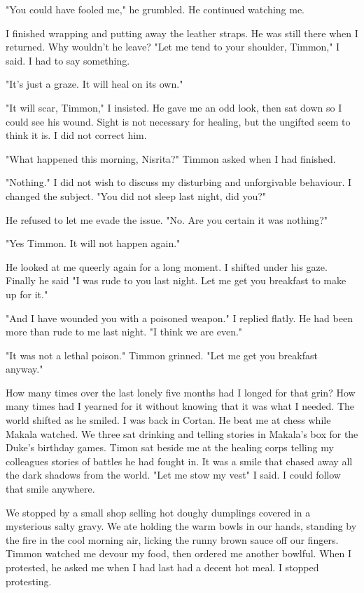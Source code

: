 \documentclass{article}
\begin{document}
"You could have fooled me," he grumbled. He continued watching me. 

I finished wrapping and putting away the leather straps. He was still there when I returned. Why wouldn't he leave? "Let me tend to your shoulder, Timmon," I said. I had to say something.

"It's just a graze. It will heal on its own."

"It will scar, Timmon," I insisted. He gave me an odd look, then sat down so I could see his wound. Sight is not necessary for healing, but the ungifted seem to think it is. I did not correct him.

"What happened this morning, Nisrita?" Timmon asked when I had finished.

"Nothing." I did not wish to discuss my disturbing and unforgivable behaviour. I changed the subject. "You did not sleep last night, did you?"

He refused to let me evade the issue. "No. Are you certain it was nothing?"

"Yes Timmon. It will not happen again."

He looked at me queerly again for a long moment. I shifted under his gaze. Finally he said "I was rude to you last night. Let me get you breakfast to make up for it."

"And I have wounded you with a poisoned weapon."  I replied flatly. He had been more than rude to me last night. "I think we are even."

"It was not a lethal poison." Timmon grinned. "Let me get you breakfast anyway." 

How many times over the last lonely five months had I longed for that grin? How many times had I yearned for it without knowing that it was what I needed. The world shifted as he smiled. I was back in Cortan. He beat me at chess while Makala watched. We three sat drinking and telling stories in Makala's box for the Duke's birthday games. Timon sat beside me at the healing corps telling my colleagues stories of battles he had fought in. It was a smile that chased away all the dark shadows from the world. "Let me stow my vest" I said. I could follow that smile anywhere.

We stopped by a small shop selling hot doughy dumplings covered in a mysterious salty gravy. We ate holding the warm bowls in our hands, standing by the fire in the cool morning air, licking the runny brown sauce off our fingers. Timmon watched me devour my food, then ordered me another bowlful. When I protested, he asked me when I had last had a decent hot meal. I stopped protesting. 
\end{document}
